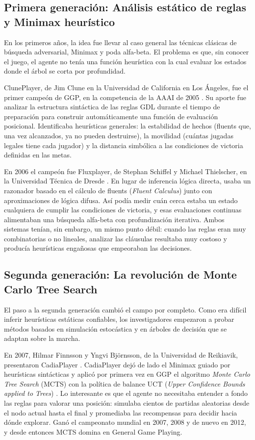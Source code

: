\subsection{Primera generación: Análisis estático de reglas y Minimax heurístico}

En los primeros años, la idea fue llevar al caso general las técnicas clásicas de búsqueda adversarial, Minimax y poda alfa-beta. El problema es que, sin conocer el juego, el agente no tenía una función heurística con la cual evaluar los estados donde el árbol se corta por profundidad.

ClunePlayer, de Jim Clune en la Universidad de California en Los Ángeles, fue el primer campeón de GGP, en la competencia de la AAAI de 2005 \cite{Clune2007ClunePlayer}. Su aporte fue analizar la estructura sintáctica de las reglas GDL durante el tiempo de preparación para construir automáticamente una función de evaluación posicional. Identificaba heurísticas generales: la estabilidad de hechos (fluents que, una vez alcanzados, ya no pueden destruirse), la movilidad (cuántas jugadas legales tiene cada jugador) y la distancia simbólica a las condiciones de victoria definidas en las metas.

En 2006 el campeón fue Fluxplayer, de Stephan Schiffel y Michael Thielscher, en la Universidad Técnica de Dresde \cite{Schiffel2007Fluxplayer}. En lugar de inferencia lógica directa, usaba un razonador basado en el cálculo de fluents (\textit{Fluent Calculus}) junto con aproximaciones de lógica difusa. Así podía medir cuán cerca estaba un estado cualquiera de cumplir las condiciones de victoria, y esas evaluaciones continuas alimentaban una búsqueda alfa-beta con profundización iterativa. Ambos sistemas tenían, sin embargo, un mismo punto débil: cuando las reglas eran muy combinatorias o no lineales, analizar las cláusulas resultaba muy costoso y producía heurísticas engañosas que empeoraban las decisiones.

\subsection{Segunda generación: La revolución de Monte Carlo Tree Search}

El paso a la segunda generación cambió el campo por completo. Como era difícil inferir heurísticas estáticas confiables, los investigadores empezaron a probar métodos basados en simulación estocástica y en árboles de decisión que se adaptan sobre la marcha.

En 2007, Hilmar Finnsson y Yngvi Björnsson, de la Universidad de Reikiavik, presentaron CadiaPlayer \cite{Finnsson2008CadiaPlayer}. CadiaPlayer dejó de lado el Minimax guiado por heurísticas sintácticas y aplicó por primera vez en GGP el algoritmo \textit{Monte Carlo Tree Search} (MCTS) con la política de balance UCT (\textit{Upper Confidence Bounds applied to Trees}) \cite{Browne2012MCTS}. Lo interesante es que el agente no necesitaba entender a fondo las reglas para valorar una posición: simulaba cientos de partidas aleatorias desde el nodo actual hasta el final y promediaba las recompensas para decidir hacia dónde explorar. Ganó el campeonato mundial en 2007, 2008 y de nuevo en 2012, y desde entonces MCTS domina en General Game Playing.

